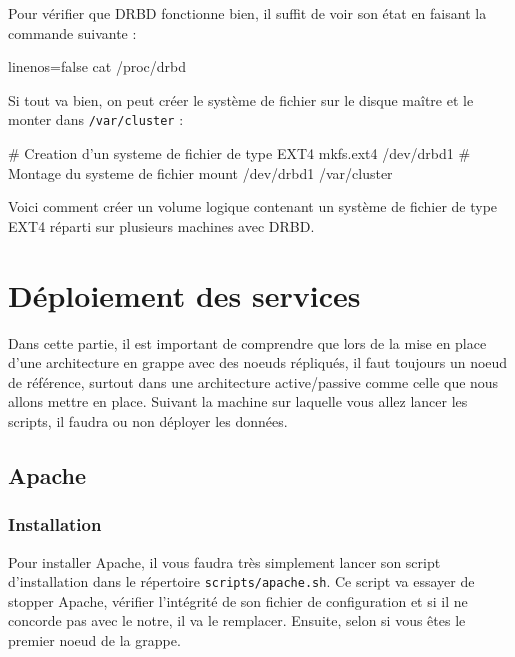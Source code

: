 \documentclass[11pt,a4paper]{report}
\begin{document}
                Pour v\'erifier que DRBD fonctionne bien, il suffit de voir son \'etat en faisant la commande suivante :\\
                
                \begin{bashcode*}{linenos=false}
                    cat /proc/drbd
                \end{bashcode*}
                
                Si tout va bien, on peut cr\'eer le syst\`eme de fichier sur le disque ma\^itre et le monter dans \verb+/var/cluster+ :\\
                
                \begin{bashcode}
                    # Creation d'un systeme de fichier de type EXT4
                    mkfs.ext4 /dev/drbd1
                    # Montage du systeme de fichier
                    mount /dev/drbd1 /var/cluster
                \end{bashcode}
                
                Voici comment cr\'eer un volume logique contenant un syst\`eme de fichier de type EXT4 r\'eparti sur plusieurs machines avec DRBD.
                
        \section{D\'eploiement des services}
            
            Dans cette partie, il est important de comprendre que lors de la mise en place d'une architecture en grappe avec des noeuds r\'epliqu\'es, il faut toujours un noeud de r\'ef\'erence, surtout dans une architecture active/passive comme celle que nous allons mettre en place.
            Suivant la machine sur laquelle vous allez lancer les scripts, il faudra ou non d\'eployer les donn\'ees.
            
            \subsection{Apache}
                
                \subsubsection{Installation}
                    
                    Pour installer Apache, il vous faudra tr\`es simplement lancer son script d'installation dans le r\'epertoire \verb+scripts/apache.sh+.
                    Ce script va essayer de stopper Apache, v\'erifier l'int\'egrit\'e de son fichier de configuration et si il ne concorde pas avec le notre, il va le remplacer. Ensuite, selon si vous \^etes le premier noeud de la grappe.
                    
\end{document}
